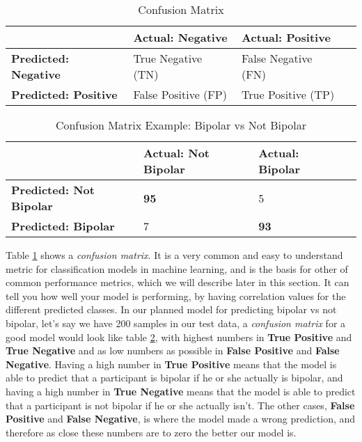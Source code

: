 \begin{table}
  \begin{center}
    \begin{tabular}{| l | l | l | l |}
      \hline
                                    & \textbf{Actual: Negative} & \textbf{Actual: Positive} \\ \hline
      \textbf{Predicted: Negative}  & True Negative (TN)        & False Negative (FN)       \\ \hline
      \textbf{Predicted: Positive}  & False Positive (FP)       & True Positive (TP)        \\
      \hline
    \end{tabular}
    \caption{Confusion Matrix}
    \label{table:confusion_matrix}
  \end{center}
\end{table}

\begin{table}
  \begin{center}
    \begin{tabular}{| l | l | l | l |}
      \hline
                                      & \textbf{Actual: Not Bipolar} & \textbf{Actual: Bipolar} \\ \hline
      \textbf{Predicted: Not Bipolar} & \textbf{95}                  & 5                        \\ \hline
      \textbf{Predicted: Bipolar}     & 7                            & \textbf{93}              \\
      \hline
    \end{tabular}
    \caption{Confusion Matrix Example: Bipolar vs Not Bipolar}
    \label{table:confusion_matrix_bipolar}
  \end{center}
\end{table}

Table \ref{table:confusion_matrix} shows a \textit{confusion matrix}. It is a very common and easy to understand metric for classification models in machine 
learning, and is the basis for other of common performance metrics, which we will describe later in this section. It can tell you how well your model is performing, 
by having correlation values for the different predicted classes. In our planned model for 
predicting bipolar vs not bipolar, let's say we have 200 samples in our test data, a \textit{confusion matrix} for a good model would look like 
table \ref{table:confusion_matrix_bipolar}, with highest numbers in \textbf{True Positive} and \textbf{True Negative} and as low numbers as possible in 
\textbf{False Positive} and \textbf{False Negative}. Having a high number in \textbf{True Positive} means that the model is able to predict that a 
participant is bipolar if he or she actually is bipolar, and having a high number in \textbf{True Negative} means that the model is able to predict 
that a participant is not bipolar if he or she actually isn't. The other cases, \textbf{False Positive} and \textbf{False Negative}, is where the model
made a wrong prediction, and therefore as close these numbers are to zero the better our model is.

